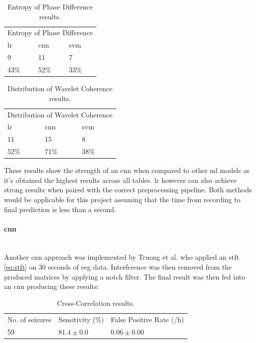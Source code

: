 \documentclass[12pt]{article}
\begin{document}
\begin{table}[H]
\centering
\begin{tabular}{lll}
\multicolumn{3}{l}{Entropy of Phase Difference} \\
\acrshort{lr}          & \acrshort{cnn}        & \acrshort{svm}        \\
9              & 11             & 7             \\
43\%           & 52\%           & 33\%         
\end{tabular}
\caption{Entropy of Phase Difference results. }
\end{table}

\begin{table}[H]
\centering
\begin{tabular}{lll}
\multicolumn{3}{l}{Distribution of Wavelet Coherence} \\
\acrshort{lr}          & \acrshort{cnn}        & \acrshort{svm}        \\
11               & 15               & 8               \\
52\%             & 71\%             & 38\%           
\end{tabular}
\caption{Distribution of Wavelet Coherence results.}
\end{table}


These results show the strength of an \acrshort{cnn} when compared to other \acrshort{ml} models as it's obtained the highest results across all tables. \acrshort{lr} however can also achieve strong results when paired with the correct preprocessing pipeline. Both methods would be applicable for this project assuming that the time from recording to final prediction is less than a second.

\paragraph{\acrfull{cnn}}\mbox{}\\

Another \acrshort{cnn} approach was implemented by Truong et al. \cite{truong2018convolutional} who applied an \acrfull{stft} \ref{eq:stft} on 30 seconds of \acrshort{eeg} data. Interference was then removed from the produced matrices by applying a notch filter. The final result was then fed into an \acrshort{cnn} producing these results:

\begin{table}[H]
\centering
\begin{tabular}{lll}
No. of seizures & Sensitivity (\%) & False Positive Rate (/h) \\
59              & $81.4 \pm 0.0$   & $0.06 \pm 0.00$         
\end{tabular}
\caption{Cross-Correlation results. }
\label{tab:my-table}
\end{table}
\end{document}

